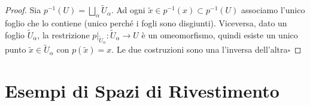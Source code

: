 \begin{proof}
Sia $p^{-1}(U) = \bigsqcup_\alpha \widetilde{U}_\alpha$. Ad ogni $\widetilde{x} \in p^{-1}(x) \subset p^{-1}(U)$ associamo l'unico foglio che lo contiene (unico perch\'e i fogli sono disgiunti). Viceversa, dato un foglio $\widetilde{U}_\alpha$, la restrizione $p|_{\widetilde{U}_\alpha}: \widetilde{U}_\alpha \to U$ \`e un omeomorfismo, quindi esiste un unico punto $\widetilde{x} \in \widetilde{U}_\alpha$ con $p(\widetilde{x}) = x$. Le due costruzioni sono una l'inversa dell'altra\hfill$\square$
\end{proof}

\section{Esempi di Spazi di Rivestimento}

